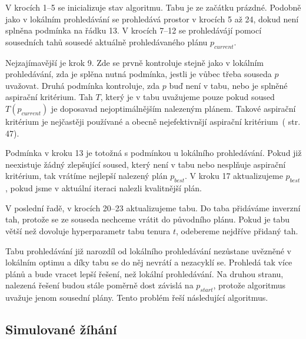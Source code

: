 V krocích 1--5 se inicializuje stav algoritmu. Tabu je ze začátku prázdné.
Podobně jako v lokálním prohledávání se prohledává prostor v krocích 5 až 24, dokud není splněna podmínka na řádku 13.
V krocích 7--12 se prohledávájí pomocí sousedních tahů sousedé aktuálně prohledávaného plánu $p_{current}$. 

Nejzajímavější je krok 9. Zde se prvně kontroluje stejně jako v lokálním prohledávání, zda je splěna nutná podmínka, jestli je vůbec třeba souseda $p$ uvažovat.
Druhá podmínka kontroluje, zda $p$ buď není v tabu, nebo je splněné aspirační kritérium.
Tah $T$, který je v tabu uvažujeme pouze pokud soused $T(p_{current})$ je doposavad nejoptimálnějším nalezeným plánem.
Takové aspirační kritérium je nejčastěji používané a obecně nejefektivnšjí aspirační kritérium~(\cite{GlovKoch03} str. 47).

Podmínka v kroku 13 je totožná s podmínkou u lokálního prohledávání.
Pokud již neexistuje žádný zlepšující soused, který není v tabu nebo nesplňuje aspirační kritérium, tak vrátíme nejlepší nalezený plán $p_{best}$.
V kroku 17 aktualizujeme $p_{best}$, pokud jsme v aktuální iteraci nalezli kvalitnější plán.

V poslední řadě, v krocích 20--23 aktualizujeme tabu.
Do taba přidáváme inverzní tah, protože se ze souseda nechceme vrátit do původního plánu.
Pokud je tabu větší než dovoluje hyperparametr tabu tenura $t$, odebereme nejdříve přidaný tah.

Tabu prohledávání již narozdíl od lokálního prohledávání nezůstane uvězněné v lokálním optimu a díky tabu se do něj nevrátí a nezacyklí se.
Prohledá tak více plánů a bude vracet lepší řešení, než lokální prohledávání.
Na druhou stranu, nalezená řešení budou stále poměrně dost závislá na $p_{start}$, protože algoritmus uvažuje jenom sousední plány.
Tento problém řeší následující algoritmus.

\subsection{Simulované žíhání}



